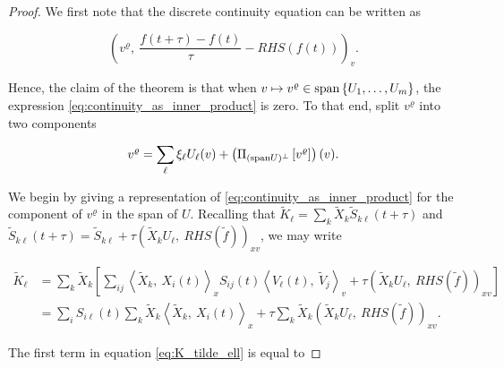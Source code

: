 \begin{proof}
    We first note that the discrete continuity equation can be written as 

    \begin{equation}\label{eq:continuity_as_inner_product}
        \left( v^\varrho,\ \frac{f(t+\tau) - f(t)}{\tau} - RHS (f(t)) \right)_v . 
    \end{equation}

    Hence, the claim of the theorem is that when 
    $v \mapsto v^\varrho \in \text{span} \left\{ U_1, \ldots, U_m \right\}$, 
    the expression \ref{eq:continuity_as_inner_product} is zero. To that end, 
    split $v^\varrho$ into two components
    
    \begin{equation}\label{eq:split_v_varrho}
        v^\varrho = \sum_\ell \xi_\ell U_\ell (v) 
            + \left( \Pi_{(\text{span} U)^\perp} \left[ v^\varrho \right] \right) (v) . 
    \end{equation}
    
    We begin by giving a representation of \ref{eq:continuity_as_inner_product} 
    for the component of $v^\varrho$ in the span of $U$. 
    Recalling that 
    $\widetilde{ K }_\ell = \sum_k \widetilde{ X }_k \widetilde{ S }_{k \ell} (t + \tau)$ 
    and 
    $\widetilde{ S }_{k \ell} (t + \tau) 
    = \widetilde{ S }_{k \ell} + \tau \left( \widetilde{ X }_k U_\ell,\ RHS (\widetilde{ f }) \right)_{x v}$, 
    we may write 

    \begin{equation}\label{eq:K_tilde_ell}
        \begin{split}
            \widetilde{ K }_\ell &= 
            \sum_k \widetilde{ X }_k \left[ 
                \sum_{i j} \left\langle \widetilde{ X }_k,\ X_i (t) \right\rangle_x
                    S_{i j} (t) \left\langle V_\ell (t),\ \widetilde{ V }_j \right\rangle_v
                + \tau \left( \widetilde{ X }_k U_\ell,\ RHS (\widetilde{ f }) \right)_{x v}
             \right] \\
            &= \sum_i S_{i \ell} (t) \sum_k 
                \widetilde{ X }_k \left\langle \widetilde{ X }_k,\ X_i (t) \right\rangle_x
                + \tau \sum_k \widetilde{ X }_k 
                    \left( \widetilde{ X }_k U_\ell,\ RHS (\widetilde{ f }) \right)_{x v} . 
        \end{split}
    \end{equation}

    The first term in equation \ref{eq:K_tilde_ell} is equal to 


\end{proof}
